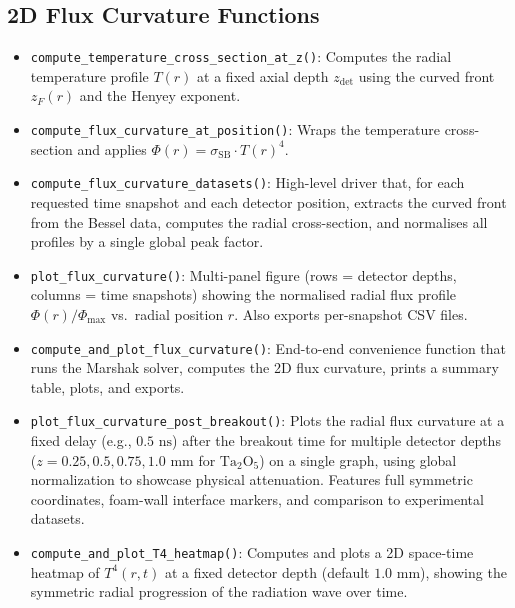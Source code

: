\documentclass{article}
\begin{document}
\subsection{2D Flux Curvature Functions}
\begin{itemize}
    \item \texttt{compute\_temperature\_cross\_section\_at\_z()}: Computes the radial temperature profile $T(r)$ at a fixed axial depth $z_{\text{det}}$ using the curved front $z_F(r)$ and the Henyey exponent.
    \item \texttt{compute\_flux\_curvature\_at\_position()}: Wraps the temperature cross-section and applies $\Phi(r) = \sigma_{\text{SB}} \cdot T(r)^4$.
    \item \texttt{compute\_flux\_curvature\_datasets()}: High-level driver that, for each requested time snapshot and each detector position, extracts the curved front from the Bessel data, computes the radial cross-section, and normalises all profiles by a single global peak factor.
    \item \texttt{plot\_flux\_curvature()}: Multi-panel figure (rows = detector depths, columns = time snapshots) showing the normalised radial flux profile $\Phi(r)/\Phi_{\max}$ vs.\ radial position $r$. Also exports per-snapshot CSV files.
    \item \texttt{compute\_and\_plot\_flux\_curvature()}: End-to-end convenience function that runs the Marshak solver, computes the 2D flux curvature, prints a summary table, plots, and exports.
    \item \texttt{plot\_flux\_curvature\_post\_breakout()}: Plots the radial flux curvature at a fixed delay (e.g., $0.5\text{ ns}$) after the breakout time for multiple detector depths ($z = 0.25, 0.5, 0.75, 1.0\text{ mm}$ for $\text{Ta}_2\text{O}_5$) on a single graph, using global normalization to showcase physical attenuation. Features full symmetric coordinates, foam-wall interface markers, and comparison to experimental datasets.
    \item \texttt{compute\_and\_plot\_T4\_heatmap()}: Computes and plots a 2D space-time heatmap of $T^4(r, t)$ at a fixed detector depth (default $1.0\text{ mm}$), showing the symmetric radial progression of the radiation wave over time.
\end{itemize}
\end{document}
